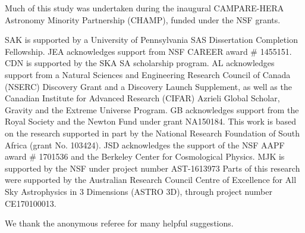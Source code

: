 \documentclass[twocolumn, trackchanges]{aastex61}
\begin{document}
Much of this study was undertaken during the inaugural CAMPARE-HERA Astronomy
Minority Partnership (CHAMP), funded under the NSF grants.

SAK is supported by a University of Pennsylvania SAS Dissertation Completion
Fellowship.
JEA acknowledges support from NSF CAREER award \# 1455151.
CDN is supported by the SKA SA scholarship program.
AL acknowledges support from a Natural Sciences and Engineering Research Council
of Canada (NSERC) Discovery Grant and a Discovery Launch Supplement, as well as
the Canadian Institute for Advanced Research (CIFAR) Azrieli Global Scholar,
Gravity and the Extreme Universe Program.
GB acknowledges support from the Royal Society and the Newton Fund under grant
NA150184. This work is based on the research supported in part by the National
Research Foundation of South Africa (grant No. 103424).
JSD acknowledges the support of the NSF AAPF award \# 1701536 and the Berkeley
Center for Cosmological Physics.
MJK is supported by the NSF under project number AST-1613973
Parts of this research were supported by the Australian Research
Council Centre of Excellence for All Sky Astrophysics in 3 Dimensions
(ASTRO 3D), through project number CE170100013.

We thank the anonymous referee for many helpful suggestions.


\clearpage



\end{document}
